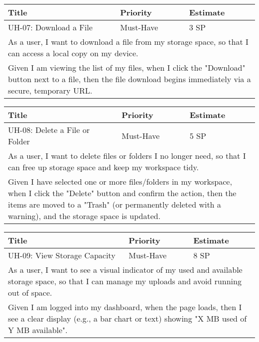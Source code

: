 \vspace{5mm}
\begin{tabular}{|p{4cm}|p{5cm}|p{5cm}|}
    \hline
    \textbf{Title} & \textbf{Priority} & \textbf{Estimate} \\
    \hline
    UH-07: Download a File & Must-Have & 3 SP \\
    \hline
    \multicolumn{3}{|p{14cm}|}{As a user, I want to download a file from my storage space, so that I can access a local copy on my device.} \\
    \hline
    \multicolumn{3}{|p{14cm}|}{Given I am viewing the list of my files, when I click the "Download" button next to a file, then the file download begins immediately via a secure, temporary URL.} \\
    \hline
\end{tabular}

\vspace{5mm}
\begin{tabular}{|p{4cm}|p{5cm}|p{5cm}|}
    \hline
    \textbf{Title} & \textbf{Priority} & \textbf{Estimate} \\
    \hline
    UH-08: Delete a File or Folder & Must-Have & 5 SP \\
    \hline
    \multicolumn{3}{|p{14cm}|}{As a user, I want to delete files or folders I no longer need, so that I can free up storage space and keep my workspace tidy.} \\
    \hline
    \multicolumn{3}{|p{14cm}|}{Given I have selected one or more files/folders in my workspace, when I click the "Delete" button and confirm the action, then the items are moved to a "Trash" (or permanently deleted with a warning), and the storage space is updated.} \\
    \hline
\end{tabular}

\vspace{5mm}
\begin{tabular}{|p{4cm}|p{5cm}|p{5cm}|}
    \hline
    \textbf{Title} & \textbf{Priority} & \textbf{Estimate} \\
    \hline
    UH-09: View Storage Capacity & Must-Have & 8 SP \\
    \hline
    \multicolumn{3}{|p{14cm}|}{As a user, I want to see a visual indicator of my used and available storage space, so that I can manage my uploads and avoid running out of space.} \\
    \hline
    \multicolumn{3}{|p{14cm}|}{Given I am logged into my dashboard, when the page loads, then I see a clear display (e.g., a bar chart or text) showing "X MB used of Y MB available".} \\
    \hline
\end{tabular}

